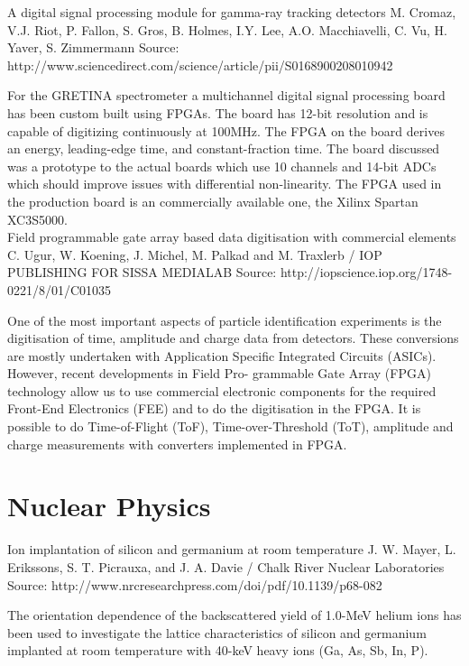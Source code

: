 \documentclass[12pt]{article}
\begin{document}
\cite{Cromaz}
A digital signal processing module for gamma-ray tracking detectors
M. Cromaz, V.J. Riot, P. Fallon, S. Gros, B. Holmes, I.Y. Lee, A.O. Macchiavelli,
C. Vu, H. Yaver, S. Zimmermann
Source: http://www.sciencedirect.com/science/article/pii/S0168900208010942

For the GRETINA spectrometer a multichannel digital signal processing board has been custom built using FPGAs. The board has 12-bit resolution and is capable of digitizing continuously at 100MHz. The FPGA on the board derives an energy, leading-edge time, and constant-fraction time. The board discussed was a prototype to the actual boards which use 10 channels and 14-bit ADCs which should improve issues with differential non-linearity. The FPGA used in the production board is an commercially available one, the Xilinx Spartan XC3S5000.
\\


\cite{Ugur}
Field programmable gate array based data digitisation with commercial elements
C. Ugur, W. Koening, J. Michel, M. Palkad and M. Traxlerb / IOP PUBLISHING FOR SISSA MEDIALAB
Source: http://iopscience.iop.org/1748-0221/8/01/C01035

One of the most important aspects of particle identification experiments is the digitisation of time, amplitude and charge data from detectors. These conversions are mostly undertaken with Application Specific Integrated Circuits (ASICs). However, recent developments in Field Pro- grammable Gate Array (FPGA) technology allow us to use commercial electronic components for the required Front-End Electronics (FEE) and to do the digitisation in the FPGA. It is possible to do Time-of-Flight (ToF), Time-over-Threshold (ToT), amplitude and charge measurements with converters implemented in FPGA. 
\\



\section{Nuclear Physics}


\cite{Mayer}
Ion implantation of silicon and germanium at room temperature
J. W. Mayer, L. Erikssons, S. T. Picrauxa, and J. A. Davie / Chalk River Nuclear Laboratories
Source: http://www.nrcresearchpress.com/doi/pdf/10.1139/p68-082

The orientation dependence of the backscattered yield of 1.0-MeV helium ions has been used to investigate the lattice characteristics of silicon and germanium implanted at room temperature with 40-keV heavy ions (Ga, As, Sb, In, P). 
\\





\end{document}
